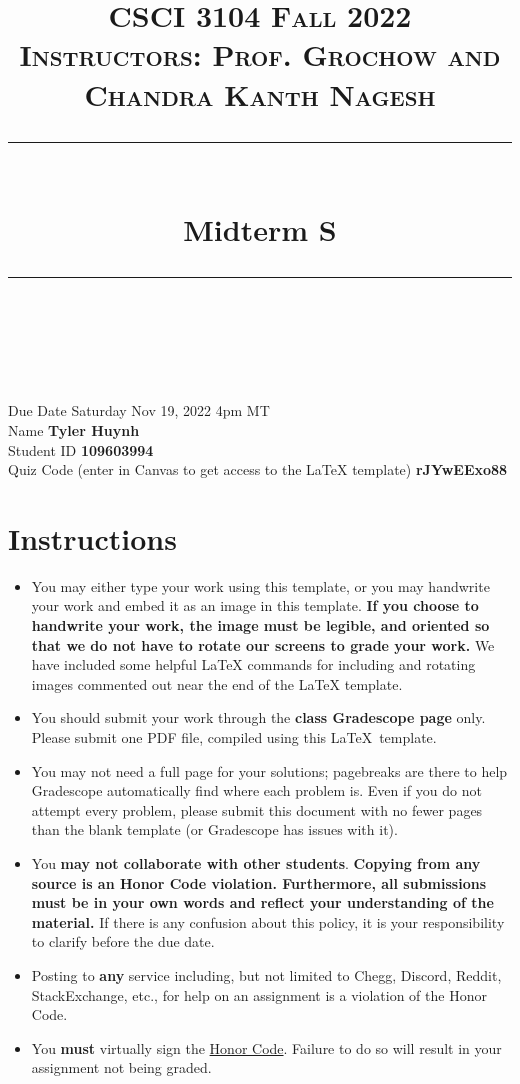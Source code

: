 \documentclass[11pt]{article}
\title{
\normalfont \normalsize 
\textsc{CSCI 3104 Fall 2022 \\ 
Instructors: Prof. Grochow and Chandra Kanth Nagesh} \\
[10pt] 
\rule{\linewidth}{0.5pt} \\[6pt] 
\huge Midterm S\standard \\
\rule{\linewidth}{2pt}  \\[10pt]
}
\date{}
\theoremstyle{definition}
\theoremstyle{definition}
\theoremstyle{definition}
\begin{document}

\maketitle


\noindent
Due Date \dotfill Saturday Nov 19, 2022 4pm MT \\
Name \dotfill \textbf{Tyler Huynh} \\
Student ID \dotfill \textbf{109603994} \\
Quiz Code (enter in Canvas to get access to the LaTeX template) \dotfill \textbf{rJYwEExo88}


\tableofcontents

\section*{Instructions}
 \begin{itemize}
	\item You may either type your work using this template, or you may handwrite your work and embed it as an image in this template. \textbf{If you choose to handwrite your work, the image must be legible, and oriented so that we do not have to rotate our screens to grade your work.} We have included some helpful LaTeX commands for including and rotating images commented out near the end of the LaTeX template.
	\item You should submit your work through the \textbf{class Gradescope page} only. Please submit one PDF file, compiled using this \LaTeX \ template.
	\item You may not need a full page for your solutions; pagebreaks are there to help Gradescope automatically find where each problem is. Even if you do not attempt every problem, please submit this document with no fewer pages than the blank template (or Gradescope has issues with it).

	\item You \textbf{may not collaborate with other students}. \textbf{Copying from any source is an Honor Code violation. Furthermore, all submissions must be in your own words and reflect your understanding of the material.} If there is any confusion about this policy, it is your responsibility to clarify before the due date. 

	\item Posting to \textbf{any} service including, but not limited to Chegg, Discord, Reddit, StackExchange, etc., for help on an assignment is a violation of the Honor Code.

	\item You \textbf{must} virtually sign the \hyperlink{HonorCode}{Honor Code}. Failure to do so will result in your assignment not being graded.
\end{itemize}
\end{document}
